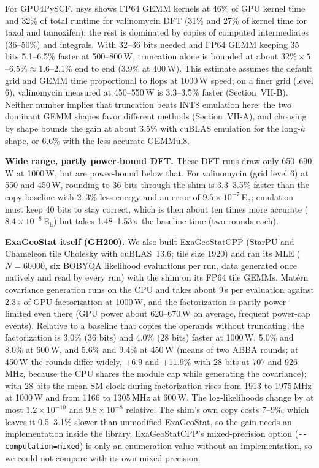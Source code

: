 \documentclass[conference]{IEEEtran}
\newcommand{\W}{\,W}
\newcommand{\Eh}{\,E$_\mathrm{h}$}
\newcommand{\ee}[2]{#1{\times}10^{#2}}  %
\newcommand{\pct}{\%}
\begin{document}
For GPU4PySCF, nsys shows FP64 GEMM kernels at 46\pct{} of GPU kernel time and 32\pct{} of total runtime for
valinomycin DFT (31\pct{} and 27\pct{} of kernel time for taxol and tamoxifen); the rest is dominated by copies of
computed intermediates (36--50\pct) and integrals. With 32--36 bits needed and FP64 GEMM keeping 35 bits
5.1--6.5\pct{} faster at 500--800\W, truncation alone is bounded at about $32\pct\times5$--$6.5\pct\approx1.6$--2.1\pct{}
end to end (3.9\pct{} at 400\W). This estimate assumes the default grid and GEMM time proportional to flops at
1000\W{} speed; on a finer grid (level 6), valinomycin measured at 450--550\W{} is 3.3--3.5\pct{} faster
(Section~VII-B). Neither number implies that truncation beats INT8 emulation here: the two
dominant GEMM shapes favor different methods (Section~VII-A), and choosing by shape bounds the gain at
about 3.5\pct{} with cuBLAS emulation for the long-$k$ shape, or 6.6\pct{} with the less accurate GEMMul8.

\textbf{Wide range, partly power-bound DFT.} These DFT runs draw only 650--690\W{} at 1000\W, but are power-bound
below that. For valinomycin (grid level 6) at 550 and 450\W, rounding to 36 bits through the shim is 3.3--3.5\pct{}
faster than the copy baseline with 2--3\pct{} less energy and an error of $\ee{9.5}{-7}$\Eh; emulation must keep 40
bits to stay correct, which is then about ten times more accurate ($\ee{8.4}{-8}$\Eh) but takes 1.48--1.53$\times$
the baseline time (two rounds each).

\textbf{ExaGeoStat itself (GH200).} We also built ExaGeoStatCPP (StarPU and Chameleon tile Cholesky with cuBLAS~13.6; tile
size 1920) and ran its MLE ($N=60000$, six BOBYQA likelihood evaluations per run, data generated once natively and
read by every run) with the shim on its FP64 tile GEMMs. Matérn covariance generation runs on the CPU and takes about
9\,s per evaluation against 2.3\,s of GPU factorization at 1000\W, and the factorization is partly power-limited even
there (GPU power about 620--670\W{} on average, frequent power-cap events). Relative to a baseline that copies the operands without
truncating, the factorization is 3.0\pct{} (36 bits) and 4.0\pct{} (28 bits) faster at 1000\W, 5.0\pct{} and
8.0\pct{} at 600\W, and 5.6\pct{} and 9.4\pct{} at 450\W{} (means of two ABBA rounds; at 450\W{} the rounds differ
widely, +6.9 and +11.9\pct{} with 28 bits at 707 and 926\,MHz, because the CPU shares the module cap while generating
the covariance); with 28 bits the mean SM clock during factorization rises from 1913 to 1975\,MHz at 1000\W{} and
from 1166 to 1305\,MHz at 600\W. The log-likelihoods change by at most $\ee{1.2}{-10}$ and $\ee{9.8}{-8}$ relative.
The shim's own copy costs 7--9\pct, which leaves it 0.5--3.1\pct{} slower than unmodified ExaGeoStat, so the gain
needs an implementation inside the library. ExaGeoStatCPP's mixed-precision option (\texttt{-{}-computation=mixed}) is
only an enumeration value without an implementation, so we could not compare with its own mixed precision.
\end{document}

